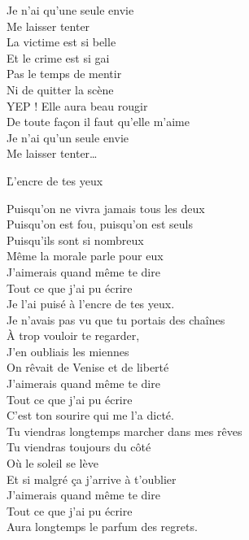 \documentclass{novel}
\begin{document}
{\begin{minipage}[t][0.45\textheight][t]{\textwidth}
\begin{multicols}{2}
Je n'ai qu'une seule envie \\
Me laisser tenter \\
La victime est si belle \\
Et le crime est si gai \\

Pas le temps de mentir \\
Ni de quitter la scène \\
YEP ! Elle aura beau rougir \\
De toute façon il faut qu'elle m'aime \\
Je n'ai qu'un seule envie \\
Me laisser tenter… 
\end{multicols}
\end{minipage}
\vspace{0.02\textheight}

\begin{minipage}[b][0.7\textheight][t]{\textwidth}
\h*{L’encre de tes yeux}
\begin{multicols}{2}
\small
Puisqu'on ne vivra jamais tous les deux \\
Puisqu'on est fou, puisqu'on est seuls \\
Puisqu'ils sont si nombreux \\
Même la morale parle pour eux \\

J'aimerais quand même te dire \\
Tout ce que j'ai pu écrire \\
Je l'ai puisé à l'encre de tes yeux. \\

Je n'avais pas vu que tu portais des chaînes \\
À trop vouloir te regarder, \\
J'en oubliais les miennes \\
On rêvait de Venise et de liberté \\
J'aimerais quand même te dire \\
Tout ce que j'ai pu écrire \\
C'est ton sourire qui me l'a dicté. \\

Tu viendras longtemps marcher dans mes rêves \\
Tu viendras toujours du côté \\
Où le soleil se lève \\
Et si malgré ça j'arrive à t'oublier \\
J'aimerais quand même te dire \\
Tout ce que j'ai pu écrire \\
Aura longtemps le parfum des regrets. \\
\end{multicols}
\end{minipage}
}
\end{document}
